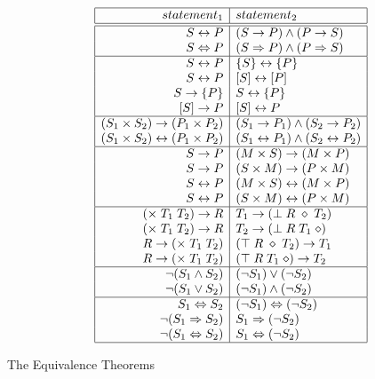 \begin{description}
\begin{table}[htb]
\[\begin{array}{|r|l|} \hline
statement_1 & statement_2 \\
\hline \hline
S \leftrightarrow P & (S \rightarrow P) \wedge (P \rightarrow S) \\
S \Leftrightarrow P & (S \Rightarrow P) \wedge (P \Rightarrow S) \\
\hline
S \leftrightarrow P & \{S\} \leftrightarrow \{P\} \\
S \leftrightarrow P & [S] \leftrightarrow [P] \\
S \rightarrow \{P\} & S \leftrightarrow \{P\} \\
\mbox{[}S\mbox{]} \rightarrow P & [S] \leftrightarrow P \\
\hline
(S_1 \times S_2) \rightarrow (P_1 \times P_2) & (S_1 \rightarrow P_1) \wedge (S_2 \rightarrow P_2) \\
(S_1 \times S_2) \leftrightarrow (P_1 \times P_2) & (S_1 \leftrightarrow P_1) \wedge (S_2 \leftrightarrow P_2) \\
\hline
S \rightarrow P & (M \times S) \rightarrow (M \times P) \\
S \rightarrow P & (S \times M) \rightarrow (P \times M) \\
S \leftrightarrow P & (M \times S) \leftrightarrow (M \times P) \\
S \leftrightarrow P & (S \times M) \leftrightarrow (P \times M) \\
\hline
(\times \; T_1 \; T_2) \rightarrow R & T_1 \rightarrow (\bot \; R \; \diamond \; T_2) \\
(\times \; T_1 \; T_2) \rightarrow R & T_2 \rightarrow (\bot \; R \; T_1 \; \diamond) \\
R \rightarrow (\times \; T_1 \; T_2) & (\top \; R \; \diamond \; T_2) \rightarrow T_1 \\
R \rightarrow (\times \; T_1 \; T_2) & (\top \; R \; T_1 \; \diamond) \rightarrow T_2 \\
\hline
\neg(S_1 \wedge S_2) & (\neg S_1) \vee (\neg S_2) \\
\neg(S_1 \vee S_2) & (\neg S_1) \wedge (\neg S_2) \\
\hline
S_1 \Leftrightarrow S_2 & (\neg S_1) \Leftrightarrow (\neg S_2) \\
\neg(S_1 \Rightarrow S_2) & S_1 \Rightarrow (\neg S_2) \\
\neg(S_1 \Leftrightarrow S_2) & S_1 \Leftrightarrow (\neg S_2) \\
\hline \end{array}\]
\caption{The Equivalence Theorems}
\label{Equivalence-Theorems}
\end{table}


\end{description}
